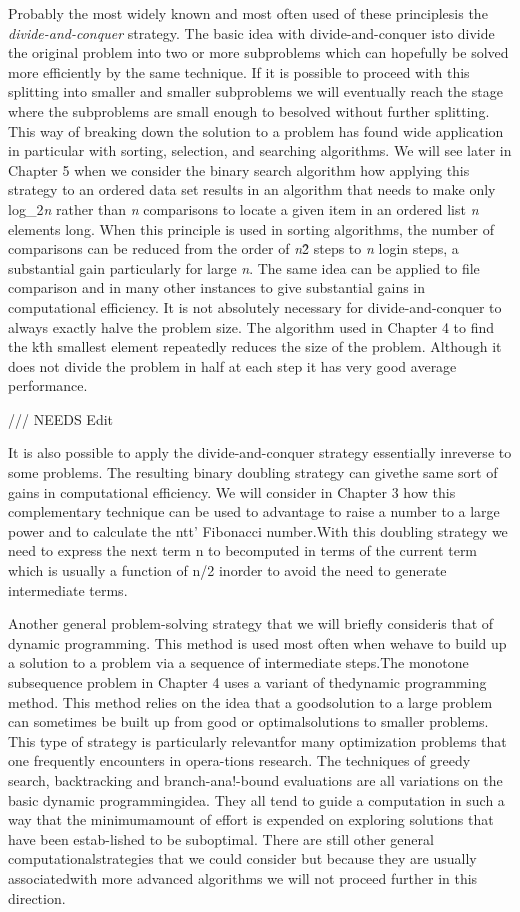 \documentclass{book}
\begin{document}
Probably the most widely known and most often used of these principlesis the \textit{divide-and-conquer} strategy. The basic idea with divide-and-conquer isto divide the original problem into two or more subproblems which can hopefully be solved more efficiently by the same technique. If it is possible to proceed with this splitting into smaller and smaller subproblems we will eventually reach the stage where the subproblems are small enough to besolved without further splitting. This way of breaking down the solution to a problem has found wide application in particular with sorting, selection, and searching algorithms. We will see later in Chapter 5 when we consider the binary search algorithm how applying this strategy to an ordered data set results in an algorithm that needs to make only log\_{2}\textit{n} rather than \textit{n} comparisons to locate a given item in an ordered list \textit{n} elements long. When this principle is used in sorting algorithms, the number of comparisons can be reduced from the order of \textit{n}\^2 steps to \textit{n} login steps, a substantial gain particularly for large \textit{n}. The same idea can be applied to file comparison and in many other instances to give substantial gains in computational efficiency. It is not absolutely necessary for divide-and-conquer to always exactly halve the problem size. The algorithm used in Chapter 4 to find the k\^{th} smallest element repeatedly reduces the size of the problem. Although it does not divide the problem in half at each step it has very good average performance. 


/// NEEDS Edit


It is also possible to apply the divide-and-conquer strategy essentially inreverse to some problems. The resulting binary doubling strategy can givethe same sort of gains in computational efficiency. We will consider in Chapter 3 how this complementary technique can be used to advantage to raise a number to a large power and to calculate the ntt' Fibonacci number.With this doubling strategy we need to express the next term n to becomputed in terms of the current term which is usually a function of n/2 inorder to avoid the need to generate intermediate terms.

Another general problem-solving strategy that we will briefly consideris that of dynamic programming. This method is used most often when wehave to build up a solution to a problem via a sequence of intermediate steps.The monotone subsequence problem in Chapter 4 uses a variant of thedynamic programming method. This method relies on the idea that a goodsolution to a large problem can sometimes be built up from good or optimalsolutions to smaller problems. This type of strategy is particularly relevantfor many optimization problems that one frequently encounters in opera-tions research. The techniques of greedy search, backtracking and branch-ana!-bound evaluations are all variations on the basic dynamic programmingidea. They all tend to guide a computation in such a way that the minimumamount of effort is expended on exploring solutions that have been estab-lished to be suboptimal. There are still other general computationalstrategies that we could consider but because they are usually associatedwith more advanced algorithms we will not proceed further in this direction.
\end{document}
